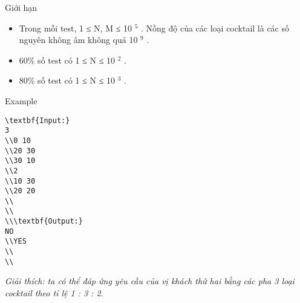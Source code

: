 Giới hạn
\begin{itemize}
	\item     Trong mỗi test, 1 ≤ N, M ≤ 10    $^     5    $    . Nồng độ của các loại cocktail là các số nguyên không âm không quá 10    $^     9    $    .   
	\item     60\% số test có 1 ≤ N ≤ 10    $^     2    $    .   
	\item     80\% số test có 1 ≤ N ≤ 10    $^     3    $    .   
\end{itemize}
Example
\begin{verbatim}
\textbf{Input:}
3
\\0 10
\\20 30 
\\30 10
\\2
\\10 30
\\20 20
\\
\\
\\\textbf{Output:}
NO
\\YES
\\
\\\end{verbatim}

\emph{    Giải thích: ta có thể đáp ứng yêu cầu của vị khách thứ hai bằng các pha 3 loại cocktail theo tỉ lệ 1 : 3 : 2.   }